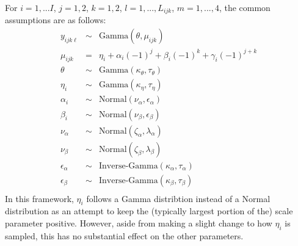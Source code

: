For $i = 1,...I$, $j = 1,2$, $k= 1,2$, $l = 1,...,L_{ijk}$, $m = 1,...,4$,
the common assumptions are as follows:\\
\begin{eqnarray*}
y_{ijk\ell} &\sim& \mbox{Gamma}\left(\theta,\mu_{ijk}\right)\\
\mu_{ijk} &=& \eta_i + \alpha_i\left(-1\right)^j + \beta_i 
\left(-1\right)^k + \gamma_i \left(-1\right)^{j+k}\\
\theta &\sim& \mbox{Gamma}(\kappa_\theta,\tau_\theta)\\
\eta_i &\sim& \mbox{Gamma}(\kappa_\eta,\tau_\eta)\\
\alpha_i &\sim& \mbox{Normal}(\nu_\alpha,\epsilon_\alpha)\\
\beta_i &\sim& \mbox{Normal}(\nu_\beta,\epsilon_\beta)\\
\nu_\alpha &\sim& \mbox{Normal}(\zeta_\alpha,\lambda_\alpha)\\
\nu_\beta &\sim& \mbox{Normal}(\zeta_\beta,\lambda_\beta)\\
\epsilon_\alpha &\sim& \mbox{Inverse-Gamma}(\kappa_\alpha,\tau_\alpha)\\
\epsilon_\beta &\sim& \mbox{Inverse-Gamma}(\kappa_\beta,\tau_\beta)\\
\end{eqnarray*}
In this framework, $\eta_i$ follows a Gamma distribtion instead of a
Normal distribution as an attempt to keep the (typically largest
portion of the) scale parameter positive.  However, aside from making
a slight change to how $\eta_i$ is sampled, this has no substantial
effect on the other parameters.

